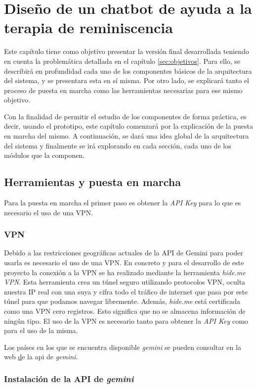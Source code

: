 \chapter{Diseño de un chatbot de ayuda a la terapia de reminiscencia}
\label{cap:ChatBot final}
Este capítulo tiene como objetivo presentar la versión final desarrollada teniendo en cuenta la problemática detallada en el capítulo \ref{sec:objetivos}. Para ello, se describirá en profundidad cada uno de los componentes básicos de la arquitectura del sistema, y se presentara esta en sí misma. Por otro lado, se explicará tanto el proceso de puesta en marcha como las herramientas necesarias para ese mismo objetivo. 

Con la finalidad de permitir el estudio de los componentes de forma práctica, es decir, usando el prototipo, este capítulo comenzará por la explicación de la puesta en marcha del mismo. A continuación, se dará una idea global de la arquitectura del sistema y finalmente se irá explorando en cada sección, cada uno de los módulos que la componen. 

\section{Herramientas y puesta en marcha}
Para la puesta en marcha el primer paso es obtener la \textit{API Key} para lo que es necesario el uso de una VPN.
\subsection{VPN}
Debido a las restricciones geográficas actuales de la API de Gemini para poder usarla es necesario el uso de una VPN. En concreto y para el desarrollo de este proyecto la conexión a la VPN se ha realizado mediante la herramienta \textit{hide.me VPN}. Esta herramienta crea un túnel seguro utilizando protocolos VPN, oculta nuestra IP real con una suya y cifra todo el tráfico de internet que pasa por este túnel para que podamos navegar libremente. Además, \textit{hide.me} está certificada como una VPN cero registros. Esto significa que no se almacena información de ningún tipo. El uso de la VPN es necesario tanto para obtener la \textit{API Key} como para el uso de la misma.

Los países en los que se encuentra disponible \textit{gemini} se pueden consultar en la web \href{https://ai.google.dev/gemini-api/docs/available-regions?hl=es-419} de la api de \textit{gemini}. 

\subsection{Instalación de la API de \textit{gemini}}

